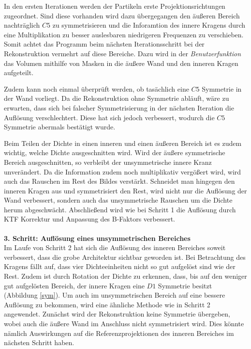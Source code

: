 In den ersten Iterationen werden der Partikeln erste Projektionsrichtungen zugeordnet.
Sind diese vorhanden wird dazu übergegangen den äußeren Bereich nachträglich $C5$ zu symmetrisieren und die Inforamtion des innere Kragens durch eine Multiplikation zu besser auslesbaren niedrigeren Frequenzen zu verschieben.
Somit achtet das Programm beim nächsten Iterationsschritt bei der Rekonstruktion vermehrt auf diese Bereiche.
Dazu wird in der \textit{Benutzerfunktion} das Volumen mithilfe von Masken in die äußere Wand und den inneren Kragen aufgeteilt.

Zudem kann noch einmal überprüft werden, ob tasächlich eine $C5$ Symmetrie in der Wand vorliegt.
Da die Rekonstruktion ohne Symmetrie abläuft, wäre zu erwarten, dass sich bei falscher Symmetrisierung in der nächsten Iteration die Auflösung verschlechtert.
Diese hat sich jedoch verbessert, wodurch die $C5$ Symmetrie abermals bestätigt wurde.

Beim Teilen der Dichte in einen inneren und einen äußeren Bereich ist es zudem wichtig, welche Dichte ausgeschnitten wird.
Wird der äußere symmetrische Bereich ausgeschnitten, so verbleibt der unsymmetrische innere Kranz unverändert.
Da die Information zudem noch multiplikativ vergößert wird, wird auch das Rauschen im Rest des Bildes verstärkt.
Schneidet man hingegen den inneren Kragen aus und symmetrisiert den Rest, wird nicht nur die Auflösung der Wand verbessert, sondern auch das unsymmetrische Rauschen um die Dichte herum abgeschwächt.
Abschließend wird wie bei Schritt 1 die Auflösung durch KTF Korrektur und Anpassung des B-Faktors verbessert.
\\
\\
\textbf{3. Schritt: Auflösung eines unsymmetrischen Bereiches}\\
Im Laufe von Schritt 2 hat sich die Auflösung des inneren Bereiches soweit verbessert, dass die grobe Architektur sichtbar geworden ist.
Bei Betrachtung des Kragens fällt auf, dass vier Dichteeinheiten nicht so gut aufgelöst sind wie der Rest.
Zudem ist durch Rotation der Dichte zu erkennen, dass, bis auf den weniger gut aufgelösten Bereich, der innere Kragen eine $D1$ Symmetrie besitzt (Abbildung \ref{sym}).
Um auch im unsymmetrischen Bereich auf eine bessere Auflösung zu bekommen, wird eine ähnliche Methode wie in Schritt 2 angewendet.
Zunächst wird der Rekonstruktion keine Symmetrie übergeben, wobei auch die äußere Wand im Anschluss nicht symmetrisiert wird.
Dies könnte nämlich Auswirkungen auf die Referenzprojektionen des inneren Bereiches im nächsten Schritt haben.

